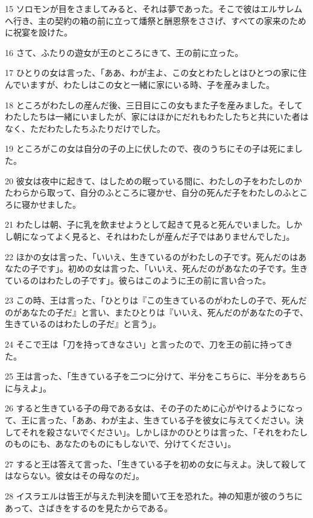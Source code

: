 \par 15 ソロモンが目をさましてみると、それは夢であった。そこで彼はエルサレムへ行き、主の契約の箱の前に立って燔祭と酬恩祭をささげ、すべての家来のために祝宴を設けた。
\par 16 さて、ふたりの遊女が王のところにきて、王の前に立った。
\par 17 ひとりの女は言った、「ああ、わが主よ、この女とわたしとはひとつの家に住んでいますが、わたしはこの女と一緒に家にいる時、子を産みました。
\par 18 ところがわたしの産んだ後、三日目にこの女もまた子を産みました。そしてわたしたちは一緒にいましたが、家にはほかにだれもわたしたちと共にいた者はなく、ただわたしたちふたりだけでした。
\par 19 ところがこの女は自分の子の上に伏したので、夜のうちにその子は死にました。
\par 20 彼女は夜中に起きて、はしための眠っている間に、わたしの子をわたしのかたわらから取って、自分のふところに寝かせ、自分の死んだ子をわたしのふところに寝かせました。
\par 21 わたしは朝、子に乳を飲ませようとして起きて見ると死んでいました。しかし朝になってよく見ると、それはわたしが産んだ子ではありませんでした」。
\par 22 ほかの女は言った、「いいえ、生きているのがわたしの子です。死んだのはあなたの子です」。初めの女は言った、「いいえ、死んだのがあなたの子です。生きているのはわたしの子です」。彼らはこのように王の前に言い合った。
\par 23 この時、王は言った、「ひとりは『この生きているのがわたしの子で、死んだのがあなたの子だ』と言い、またひとりは『いいえ、死んだのがあなたの子で、生きているのはわたしの子だ』と言う」。
\par 24 そこで王は「刀を持ってきなさい」と言ったので、刀を王の前に持ってきた。
\par 25 王は言った、「生きている子を二つに分けて、半分をこちらに、半分をあちらに与えよ」。
\par 26 すると生きている子の母である女は、その子のために心がやけるようになって、王に言った、「ああ、わが主よ、生きている子を彼女に与えてください。決してそれを殺さないでください」。しかしほかのひとりは言った、「それをわたしのものにも、あなたのものにもしないで、分けてください」。
\par 27 すると王は答えて言った、「生きている子を初めの女に与えよ。決して殺してはならない。彼女はその母なのだ」。
\par 28 イスラエルは皆王が与えた判決を聞いて王を恐れた。神の知恵が彼のうちにあって、さばきをするのを見たからである。

